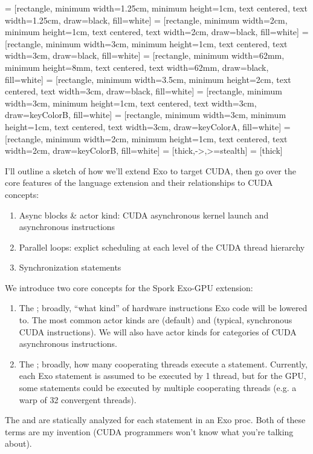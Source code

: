 


 = [rectangle, minimum width=1.25cm, minimum height=1cm, text centered, text width=1.25cm, draw=black, fill=white]
 = [rectangle, minimum width=2cm, minimum height=1cm, text centered, text width=2cm, draw=black, fill=white]
 = [rectangle, minimum width=3cm, minimum height=1cm, text centered, text width=3cm, draw=black, fill=white]
 = [rectangle, minimum width=62mm, minimum height=8mm, text centered, text width=62mm, draw=black, fill=white]
 = [rectangle, minimum width=3.5cm, minimum height=2cm, text centered, text width=3cm, draw=black, fill=white]
 = [rectangle, minimum width=3cm, minimum height=1cm, text centered, text width=3cm, draw=keyColorB, fill=white]
 = [rectangle, minimum width=3cm, minimum height=1cm, text centered, text width=3cm, draw=keyColorA, fill=white]
 = [rectangle, minimum width=2cm, minimum height=1cm, text centered, text width=2cm, draw=keyColorB, fill=white]
 = [thick,->,>=stealth]
 = [thick]



I'll outline a sketch of how we'll extend Exo to target CUDA, then go over the core features of the language extension and their relationships to CUDA concepts:

\begin{enumerate}
  \item Async blocks \& actor kind: CUDA asynchronous kernel launch and asynchronous instructions
  \item Parallel loops: explict scheduling at each level of the CUDA thread hierarchy
  \item Synchronization statements
\end{enumerate}

\filbreak
{}

We introduce two core concepts for the Spork Exo-GPU extension:
\begin{enumerate}
  \item The ; broadly, ``what kind'' of hardware instructions Exo code will be lowered to.
    The most common actor kinds are  (default) and  (typical, synchronous CUDA instructions).
    We will also have actor kinds for categories of CUDA asynchronous instructions.
  \item The ; broadly, how many cooperating threads execute a statement.
    Currently, each Exo statement is assumed to be executed by 1 thread, but for the GPU, some statements could be executed by multiple cooperating threads (e.g. a warp of 32 convergent threads).
\end{enumerate}
The  and  are statically analyzed for each statement in an Exo proc.
Both of these terms are my invention (CUDA programmers won't know what you're talking about).

